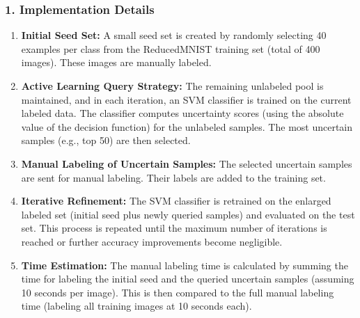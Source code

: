 \documentclass[12pt]{article}
\begin{document}
\subsubsection*{1. Implementation Details}
\begin{enumerate}
    \item \textbf{Initial Seed Set:}  
    A small seed set is created by randomly selecting 40 examples per class from the ReducedMNIST training set (total of 400 images). These images are manually labeled.
    \item \textbf{Active Learning Query Strategy:}  
    The remaining unlabeled pool is maintained, and in each iteration, an SVM classifier is trained on the current labeled data. The classifier computes uncertainty scores (using the absolute value of the decision function) for the unlabeled samples. The most uncertain samples (e.g., top 50) are then selected.
    \item \textbf{Manual Labeling of Uncertain Samples:}  
    The selected uncertain samples are sent for manual labeling. Their labels are added to the training set.
    \item \textbf{Iterative Refinement:}  
    The SVM classifier is retrained on the enlarged labeled set (initial seed plus newly queried samples) and evaluated on the test set. This process is repeated until the maximum number of iterations is reached or further accuracy improvements become negligible.
    \item \textbf{Time Estimation:}  
    The manual labeling time is calculated by summing the time for labeling the initial seed and the queried uncertain samples (assuming 10 seconds per image). This is then compared to the full manual labeling time (labeling all training images at 10 seconds each).
\end{enumerate}
\end{document}
